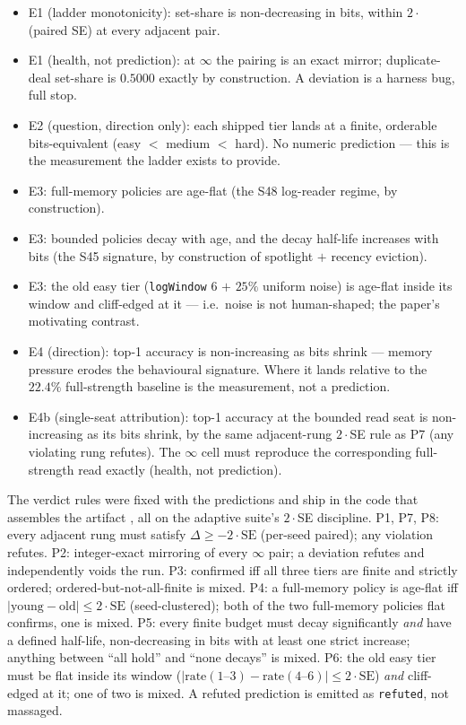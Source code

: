 \documentclass[11pt]{article}
\newcommand{\code}[1]{\texttt{#1}}
\begin{document}
\begin{itemize}
\item[\textbf{P1}] E1 (ladder monotonicity): set-share is non-decreasing in bits,
  within $2\cdot$(paired SE) at every adjacent pair.
\item[\textbf{P2}] E1 (health, not prediction): at $\infty$ the pairing is an exact
  mirror; duplicate-deal set-share is $0.5000$ exactly by construction. A deviation is
  a harness bug, full stop.
\item[\textbf{P3}] E2 (question, direction only): each shipped tier lands at a finite,
  orderable bits-equivalent (easy $<$ medium $<$ hard). No numeric prediction --- this
  is the measurement the ladder exists to provide.
\item[\textbf{P4}] E3: full-memory policies are age-flat (the S48 log-reader regime, by
  construction).
\item[\textbf{P5}] E3: bounded policies decay with age, and the decay half-life
  increases with bits (the S45 signature, by construction of spotlight $+$ recency
  eviction).
\item[\textbf{P6}] E3: the old easy tier (\code{logWindow} 6 $+$ $25\%$ uniform noise)
  is age-flat inside its window and cliff-edged at it --- i.e.\ noise is not
  human-shaped; the paper's motivating contrast.
\item[\textbf{P7}] E4 (direction): top-1 accuracy is non-increasing as bits shrink ---
  memory pressure erodes the behavioural signature. Where it lands relative to the
  $22.4\%$ full-strength baseline is the measurement, not a prediction.
\item[\textbf{P8}] E4b (single-seat attribution): top-1 accuracy at the bounded read
  seat is non-increasing as its bits shrink, by the same adjacent-rung $2 \cdot$SE rule
  as P7 (any violating rung refutes). The $\infty$ cell must reproduce the
  corresponding full-strength read exactly (health, not prediction).
\end{itemize}

The verdict rules were fixed with the predictions and ship in the code that assembles
the artifact \cite{repo}, all on the adaptive suite's $2 \cdot$SE discipline. P1, P7,
P8: every adjacent rung must satisfy $\Delta \ge -2 \cdot \text{SE}$ (per-seed paired);
any violation refutes. P2: integer-exact mirroring of every $\infty$ pair; a deviation
refutes and independently voids the run. P3: confirmed iff all three tiers are finite
and strictly ordered; ordered-but-not-all-finite is mixed. P4: a full-memory policy is
age-flat iff $|\text{young} - \text{old}| \le 2 \cdot \text{SE}$ (seed-clustered); both
of the two full-memory policies flat confirms, one is mixed. P5: every finite budget
must decay significantly \emph{and} have a defined half-life, non-decreasing in bits
with at least one strict increase; anything between ``all hold'' and ``none decays'' is
mixed. P6: the old easy tier must be flat inside its window
($|\text{rate}(1\text{--}3) - \text{rate}(4\text{--}6)| \le 2 \cdot \text{SE}$)
\emph{and} cliff-edged at it; one of two is mixed. A refuted prediction is emitted as
\code{refuted}, not massaged.
\end{document}

